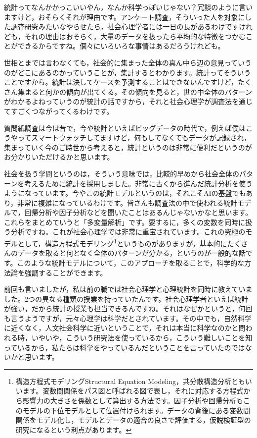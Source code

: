 \documentclass{ltjsbook}
\begin{document}
統計ってなんかかっこいいやん，なんか科学っぽいじゃない？冗談のように言いますけど，おそらくそれが理由です。アンケート調査，そういった人を対象にした調査研究みたいなやらせたら，社会心理学者には一日の長があるわけですけれども，それの理由はおそらく，大量のデータを扱ったら平均的な特徴をつかむことができるからですね。個々にいろいろな事情はあるだろうけれども。

世相とまでは言わなくても，社会的に集まった全体の真ん中ら辺の意見っていうのがどこにあるのかっていうことが，集計するとわかります。統計ってそういうことですから。統計は決してケースを予測することはできないんですけど，たくさん集まると何かの傾向が出てくる。その傾向を見ると，世の中全体のパターンがわかるよねっていうのが統計の話ですから，それと社会心理学が調査法を通じてすごくつながってくるわけです。

質問紙調査は今は昔で，今や統計といえばビッグデータの時代で，例えば僕はこうやってスマートウォッチしてますけど，何もしてなくてもデータが記録され，集まっていく今のご時世から考えると，統計というのは非常に便利だというのがお分かりいただけるかと思います。

社会を扱う学問というのは，そういう意味では，比較的早めから社会全体のパターンを考えるために統計を採用しました。非常に古くから進んだ統計分析を使うようになっています。今やこの統計モデルというのは，それこそAIの基盤でもあり，非常に複雑になっているわけです。皆さんも調査法の中で使われる統計モデルで，回帰分析や因子分析などを聞いたことはあるんじゃないかなと思います。これらをまとめていうと「多変量解析」です。要するに，多くの変数を同時に扱う分析ですね。これが社会心理学では非常に重宝されています。これの究極のモデルとして，構造方程式モデリング\footnote{構造方程式モデリングStructural Equation Modeling，共分散構造分析ともいいます。変数間関係をパス図と呼ばれる図で表し，それに対応する方程式から影響力の大きさを係数として算出する方法です。因子分析や回帰分析もこのモデルの下位モデルとして位置付けられます。データの背後にある変数間関係をモデル化し，モデルとデータの適合の良さで評価する，仮説検証型の研究になるという利点があります。}というものがありますが，基本的にたくさんのデータを取ると何となく全体のパターンが分かる，というのが一般的な話です。このような統計モデルについて，このアプローチを取ることで，科学的な方法論を強調することができます。

前回も言いましたが，私は前の職では社会心理学と心理統計を同時に教えていました。2つの異なる種類の授業を持っていたんです。社会心理学者といえば統計が強い，だから統計の授業も担当できるんですね。それはなぜかというと，何回も言うようですが，元々心理学は科学だとされています。その中でも，自然科学に近くなく，人文社会科学に近いということで，それは本当に科学なのかと問われる時，いやいや，こういう研究法を使っているから，こういう難しいことを知っているから，私たちは科学をやっているんだということを言っていたのではないかと思います。
\end{document}
